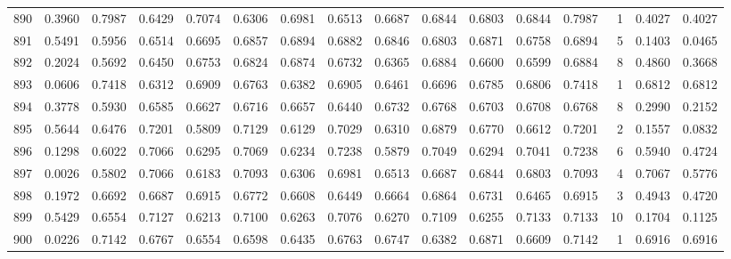 \begin{tabular}{lrrrrrrrrrrrrrrr}
890 &      0.3960 &  0.7987 &  0.6429 &  0.7074 &  0.6306 &  0.6981 &  0.6513 &  0.6687 &  0.6844 &  0.6803 &   0.6844 &     0.7987 &      1 &                    0.4027 &                     0.4027 \\
891 &      0.5491 &  0.5956 &  0.6514 &  0.6695 &  0.6857 &  0.6894 &  0.6882 &  0.6846 &  0.6803 &  0.6871 &   0.6758 &     0.6894 &      5 &                    0.1403 &                     0.0465 \\
892 &      0.2024 &  0.5692 &  0.6450 &  0.6753 &  0.6824 &  0.6874 &  0.6732 &  0.6365 &  0.6884 &  0.6600 &   0.6599 &     0.6884 &      8 &                    0.4860 &                     0.3668 \\
893 &      0.0606 &  0.7418 &  0.6312 &  0.6909 &  0.6763 &  0.6382 &  0.6905 &  0.6461 &  0.6696 &  0.6785 &   0.6806 &     0.7418 &      1 &                    0.6812 &                     0.6812 \\
894 &      0.3778 &  0.5930 &  0.6585 &  0.6627 &  0.6716 &  0.6657 &  0.6440 &  0.6732 &  0.6768 &  0.6703 &   0.6708 &     0.6768 &      8 &                    0.2990 &                     0.2152 \\
895 &      0.5644 &  0.6476 &  0.7201 &  0.5809 &  0.7129 &  0.6129 &  0.7029 &  0.6310 &  0.6879 &  0.6770 &   0.6612 &     0.7201 &      2 &                    0.1557 &                     0.0832 \\
896 &      0.1298 &  0.6022 &  0.7066 &  0.6295 &  0.7069 &  0.6234 &  0.7238 &  0.5879 &  0.7049 &  0.6294 &   0.7041 &     0.7238 &      6 &                    0.5940 &                     0.4724 \\
897 &      0.0026 &  0.5802 &  0.7066 &  0.6183 &  0.7093 &  0.6306 &  0.6981 &  0.6513 &  0.6687 &  0.6844 &   0.6803 &     0.7093 &      4 &                    0.7067 &                     0.5776 \\
898 &      0.1972 &  0.6692 &  0.6687 &  0.6915 &  0.6772 &  0.6608 &  0.6449 &  0.6664 &  0.6864 &  0.6731 &   0.6465 &     0.6915 &      3 &                    0.4943 &                     0.4720 \\
899 &      0.5429 &  0.6554 &  0.7127 &  0.6213 &  0.7100 &  0.6263 &  0.7076 &  0.6270 &  0.7109 &  0.6255 &   0.7133 &     0.7133 &     10 &                    0.1704 &                     0.1125 \\
900 &      0.0226 &  0.7142 &  0.6767 &  0.6554 &  0.6598 &  0.6435 &  0.6763 &  0.6747 &  0.6382 &  0.6871 &   0.6609 &     0.7142 &      1 &                    0.6916 &                     0.6916 \\

\end{tabular}
